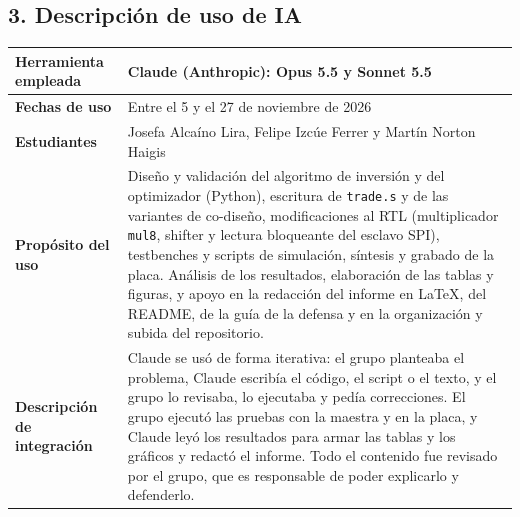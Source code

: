 \documentclass[11pt,letterpaper]{article}
\begin{document}
\subsection*{3. Descripción de uso de IA}
\vspace{4pt}
\renewcommand{\arraystretch}{1.25}
\noindent\begin{tabular}{|p{4.7cm}|p{11.3cm}|}
\hline
\textbf{Herramienta empleada} & Claude (Anthropic): Opus 5.5 y Sonnet 5.5 \\ \hline
\textbf{Fechas de uso} & Entre el 5 y el 27 de noviembre de 2026 \\ \hline
\textbf{Estudiantes} & Josefa Alcaíno Lira, Felipe Izcúe Ferrer y Martín Norton Haigis \\ \hline
\textbf{Propósito del uso} & Diseño y validación del algoritmo de inversión y del optimizador (Python),
escritura de \texttt{trade.s} y de las variantes de co-diseño, modificaciones al RTL (multiplicador
\texttt{mul8}, shifter y lectura bloqueante del esclavo SPI), testbenches y scripts de simulación,
síntesis y grabado de la placa. Análisis de los resultados, elaboración de las tablas y figuras, y apoyo
en la redacción del informe en LaTeX, del README, de la guía de la defensa y en la organización y
subida del repositorio. \\ \hline
\textbf{Descripción de integración} & Claude se usó de forma iterativa: el grupo planteaba el problema, Claude
escribía el código, el script o el texto, y el grupo lo revisaba, lo ejecutaba y pedía correcciones. El
grupo ejecutó las pruebas con la maestra y en la placa, y Claude leyó los resultados para armar las
tablas y los gráficos y redactó el informe. Todo el contenido fue revisado por el grupo, que es
responsable de poder explicarlo y defenderlo. \\ \hline
\end{tabular}
\end{document}
